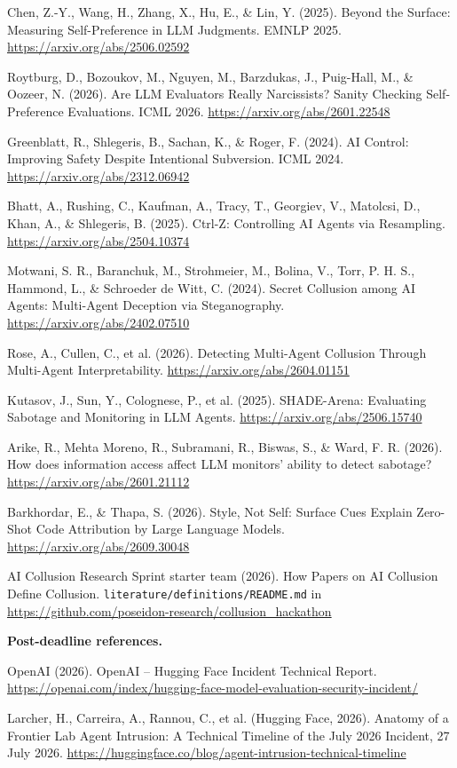 \documentclass[11pt,letterpaper]{article}
\begin{document}
\begin{enumerate}[label={[\arabic*]},leftmargin=2.2em,itemsep=1pt]
\item Chen, Z.-Y., Wang, H., Zhang, X., Hu, E., \& Lin, Y. (2025). Beyond the Surface: Measuring Self-Preference in LLM Judgments. EMNLP 2025. \url{https://arxiv.org/abs/2506.02592}
\item Roytburg, D., Bozoukov, M., Nguyen, M., Barzdukas, J., Puig-Hall, M., \& Oozeer, N. (2026). Are LLM Evaluators Really Narcissists? Sanity Checking Self-Preference Evaluations. ICML 2026. \url{https://arxiv.org/abs/2601.22548}
\item Greenblatt, R., Shlegeris, B., Sachan, K., \& Roger, F. (2024). AI Control: Improving Safety Despite Intentional Subversion. ICML 2024. \url{https://arxiv.org/abs/2312.06942}
\item Bhatt, A., Rushing, C., Kaufman, A., Tracy, T., Georgiev, V., Matolcsi, D., Khan, A., \& Shlegeris, B. (2025). Ctrl-Z: Controlling AI Agents via Resampling. \url{https://arxiv.org/abs/2504.10374}
\item Motwani, S. R., Baranchuk, M., Strohmeier, M., Bolina, V., Torr, P. H. S., Hammond, L., \& Schroeder de Witt, C. (2024). Secret Collusion among AI Agents: Multi-Agent Deception via Steganography. \url{https://arxiv.org/abs/2402.07510}
\item Rose, A., Cullen, C., et al. (2026). Detecting Multi-Agent Collusion Through Multi-Agent Interpretability. \url{https://arxiv.org/abs/2604.01151}
\item Kutasov, J., Sun, Y., Colognese, P., et al. (2025). SHADE-Arena: Evaluating Sabotage and Monitoring in LLM Agents. \url{https://arxiv.org/abs/2506.15740}
\item Arike, R., Mehta Moreno, R., Subramani, R., Biswas, S., \& Ward, F. R. (2026). How does information access affect LLM monitors' ability to detect sabotage? \url{https://arxiv.org/abs/2601.21112}
\item Barkhordar, E., \& Thapa, S. (2026). Style, Not Self: Surface Cues Explain Zero-Shot Code Attribution by Large Language Models. \url{https://arxiv.org/abs/2609.30048}
\item AI Collusion Research Sprint starter team (2026). How Papers on AI Collusion Define Collusion. \texttt{literature/definitions/README.md} in \url{https://github.com/poseidon-research/collusion_hackathon}
\end{enumerate}
\begin{postdeadline}
\textbf{Post-deadline references.}
\begin{enumerate}[label={[\arabic*]},leftmargin=2.2em,itemsep=1pt,start=21]
\item OpenAI (2026). OpenAI -- Hugging Face Incident Technical Report. \url{https://openai.com/index/hugging-face-model-evaluation-security-incident/}
\item Larcher, H., Carreira, A., Rannou, C., et al. (Hugging Face, 2026). Anatomy of a Frontier Lab Agent Intrusion: A Technical Timeline of the July 2026 Incident, 27 July 2026. \url{https://huggingface.co/blog/agent-intrusion-technical-timeline}
\end{enumerate}
\end{postdeadline}
\normalsize
\end{document}
